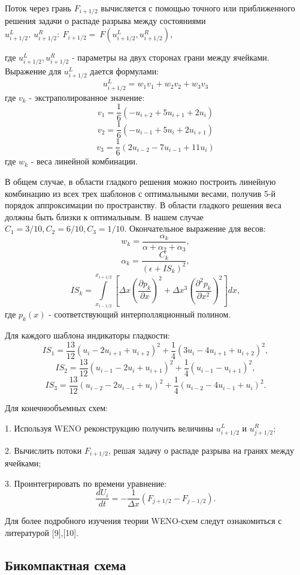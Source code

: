 \documentclass{article}
\begin{document}
Поток через грань $F_{i+1/2}$ вычисляется с помощью точного или
приближенного решения задачи о распаде разрыва между состояниями $u^L_{i+1/2}, \: u^R_{i+1/2}: \: F_{i+1/2} = \: F(u^L_{i+1/2},u^R_{i+1/2})$,

где $u^L_{i+1/2},u^R_{i+1/2}$ - параметры на двух сторонах грани между ячейками.
Выражение для $u^L_{i+1/2}$ дается формулами:
$$u^L_{i+1/2} = w_1v_1 + w_2v_2 + w_3v_3 $$
где $v_k$ - экстраполированное значение:
$$v_1 = \frac{1}{6}(-u_{i+2} + 5u_{i+1} + 2u_i)$$
$$v_2 = \frac{1}{6}(-u_{i-1} + 5u_i + 2u_{i+1})$$
$$v_3 = \frac{1}{6}(2u_{i-2} - 7u_{i-1} + 11u_i)$$
где $w_k$ - веса линейной комбинации.

В общем случае, в области гладкого решения можно построить линейную комбинацию из всех трех шаблонов с оптимальными весами, получив 5-й порядок аппроксимации по пространству. В области гладкого решения веса должны быть близки к оптимальным. В нашем случае $C_1 = 3/10, C_2 = 6/10, C_3 = 1/10.$ Окончательное выражение для весов:
$$w_k = \frac{\alpha_k}{\alpha + \alpha_2 + \alpha_3}, $$
$$\alpha_k = \frac{C_k}{(\epsilon + IS_k)^2}, $$
$$IS_k = \int\limits_{x_{i-1/2}}^{x_{i+1/2}} [\Delta x(\frac{\partial p_k}{\partial x})^2 + \Delta x^3(\frac{\partial^2 p_k}{\partial x^2})^2]dx,$$
где $p_k(x)$ - соответствующий интерполляционный полином.

Для каждого шаблона индикаторы гладкости:
$$IS_1 = \frac{13}{12}(u_i - 2u_{i+1} + u_{i+2})^2 + \frac{1}{4}(3u_i - 4u_{i+1} + u_{i+2})^2, $$
$$IS_2 = \frac{13}{12}(u_{i-1} - 2u_i + u_{i+1})^2 + \frac{1}{4}(u_{i-1} - u_{i+1})^2, $$
$$IS_3 = \frac{13}{12}(u_{i-2} - 2u_{i-1} + u_{i})^2 + \frac{1}{4}(u_{i-2} - 4u_{i-1} + u_i)^2. $$

Для конечнообъемных схем:

1. Используя WENO реконструкцию получить величины $u^L_{i+1/2}$ и $u^R_{j+1/2}$;

2. Вычислить потоки $F_{i+1/2}$, решая задачу о распаде разрыва на гранях между ячейками;

3. Проинтегрировать по времени уравнение:
$$\frac{dU_i}{dt} = -\frac{1}{\Delta x}(F_{j+1/2} - F_{j-1/2}).$$

Для более подробного изучения теории WENO-схем следут ознакомиться с литературой [9],[10].




\subsection{Бикомпактная схема}
\end{document}
